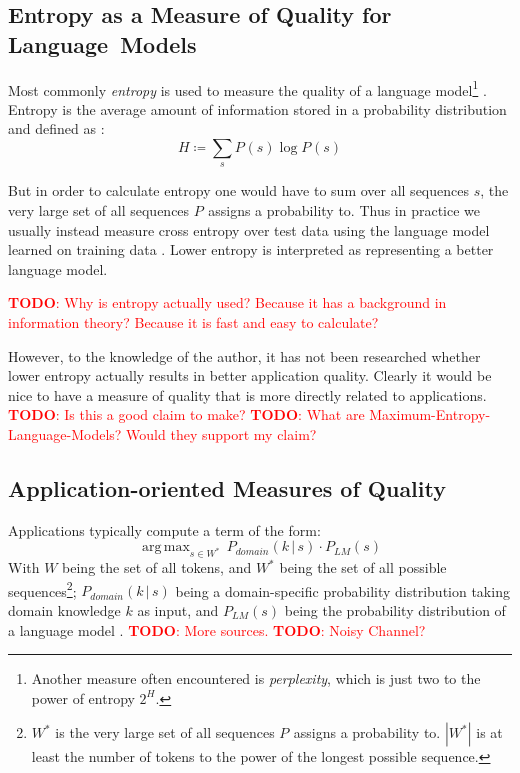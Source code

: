 \documentclass[11pt,a4paper]{article}
\newcommand\givenbase[1][]{\,#1\lvert\,}
\let\given\givenbase
\DeclareMathOperator*{\argmax}{arg\,max}
\newcommand{\cardinality}[1]{|#1|}
\newcommand{\probSymbol}[1][]{P_{#1}}
\newcommand{\prob}[2][]{\probSymbol[#1](#2)}
\newcommand{\probCond}[3][]{\prob[#1]{#2 \given #3}}
\newcommand{\todo}[1]{\textcolor{red}{\textbf{TODO}: #1}}
\begin{document}
\subsection{Entropy as a Measure of Quality for \mbox{Language Models}}

Most commonly \emph{entropy} is used to measure the quality of a language
model\footnote{Another measure often encountered is \emph{perplexity}, which is
just two to the power of entropy $2^H$.} \parencite{Goodman2001}.
Entropy is the average amount of information stored in a probability
distribution and defined as \parencite{Shannon1948}:
\begin{equation}
  H \coloneqq \sum_{s} \prob{s} \log \prob{s}
\end{equation}

But in order to calculate entropy one would have to sum over all sequences
$s$, the very large set of all sequences $\probSymbol$ assigns a probability to.
Thus in practice we usually instead measure cross entropy over test data using
the language model learned on training data \parencite{Goodman2001}.
Lower entropy is interpreted as representing a better language model.

\todo{Why is entropy actually used? Because it has a background in information
theory? Because it is fast and easy to calculate?}

However, to the knowledge of the author, it has not been researched whether
lower entropy actually results in better application quality.
Clearly it would be nice to have a measure of quality that is more directly
related to applications.
\todo{Is this a good claim to make?}
\todo{What are Maximum-Entropy-Language-Models? Would they support my claim?}

\subsection{Application-oriented Measures of Quality}

Applications typically compute a term of the form:
\begin{equation}\label{eq:argmaxprod}
  \argmax_{s \in W^*} \, \probCond[domain]{k}{s} \cdot \prob[LM]{s}
\end{equation}
With $W$ being the set of all tokens, and $W^*$ being the set of all possible
sequences\footnote{$W^*$ is the very large set of all sequences $\probSymbol$
assigns a probability to. $\cardinality{W^*}$ is at least the
number of tokens to the power of the longest possible sequence.};
$\probCond[domain]{k}{s}$ being a domain-specific probability distribution
taking domain knowledge $k$ as input, and $\prob[LM]{s}$ being the
probability distribution of a language model \parencite{Church1988,Brown1990}.
\todo{More sources.} \todo{Noisy Channel?}
\end{document}
